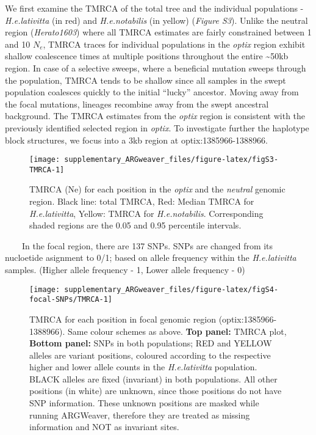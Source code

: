 \documentclass[
]{article}
\begin{document}
\hfill\break
We first examine the TMRCA of the total tree and the individual
populations - \emph{H.e.lativitta} (in red) and \emph{H.e.notabilis} (in
yellow) (\emph{Figure S3}). Unlike the neutral region
(\emph{Herato1603}) where all TMRCA estimates are fairly constrained
between 1 and 10 \(N_e\), TMRCA traces for individual populations in the
\emph{optix} region exhibit shallow coalescence times at multiple
positions throughout the entire \textasciitilde50kb region. In case of a
selective sweeps, where a beneficial mutation sweeps through the
population, TMRCA tends to be shallow since all samples in the swept
population coalesces quickly to the initial ``lucky'' ancestor. Moving
away from the focal mutations, lineages recombine away from the swept
ancestral background. The TMRCA estimates from the \emph{optix} region
is consistent with the previously identified selected region in
\emph{optix}. To investigate further the haplotype block structures, we
focus into a 3kb region at optix:1385966-1388966.

\begin{figure}

{\centering \texttt{[image: supplementary\_ARGweaver\_files/figure-latex/figS3-TMRCA-1]} 

}

\caption{TMRCA (Ne) for each position in the \textit{optix} and the \textit{neutral} genomic region. Black line: total TMRCA, Red: Median TMRCA for \textit{H.e.lativitta}, Yellow: TMRCA for \textit{H.e.notabilis}. Corresponding shaded regions are the 0.05 and 0.95 percentile intervals.}\label{fig:figS3-TMRCA}
\end{figure}

  In the focal region, there are 137 SNPs. SNPs are changed from its
nucloetide asignment to 0/1; based on allele frequency within the
\emph{H.e.lativitta} samples. (Higher allele frequency - 1, Lower allele
frequency - 0)

\begin{figure}

{\centering \texttt{[image: supplementary\_ARGweaver\_files/figure-latex/figS4-focal-SNPs/TMRCA-1]} 

}

\caption{TMRCA for each position in focal genomic region (optix:1385966-1388966). Same colour schemes as above. \textbf{Top panel:} TMRCA plot, \textbf{Bottom panel:} SNPs in both populations; RED and YELLOW alleles are variant positions, coloured according to the respective higher and lower allele counts in the \textit{H.e.lativitta} population. BLACK alleles are fixed (invariant) in both populations. All other positions (in white) are unknown, since those positions do not have SNP information. These unknown positions are masked while running ARGWeaver, therefore they are treated as missing information and NOT as invariant sites.}\label{fig:figS4-focal-SNPs/TMRCA}
\end{figure}
\end{document}
